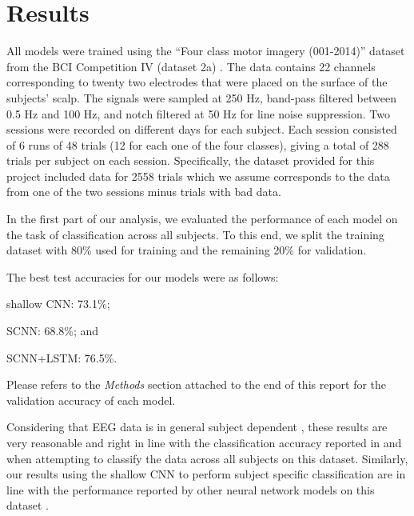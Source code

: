 \documentclass[10pt,twocolumn,letterpaper]{article}
\begin{document}


\section{Results}
All models were trained using the ``Four class motor imagery (001-2014)''
dataset from the BCI Competition IV (dataset 2a) \cite{brunner2008bci}.
The data contains 22 channels corresponding to twenty two electrodes that were
placed on the surface of the subjects' scalp.
The signals were sampled at 250 Hz, band-pass filtered between 0.5 Hz and 100
Hz, and notch filtered at 50 Hz for line noise suppression.
Two sessions were recorded on different days for each subject. Each session
consisted of 6 runs of 48 trials (12 for each one of the four classes), giving a
total of 288 trials per subject on each session. Specifically, the dataset
provided for this project included data for 2558 trials which we assume
corresponds to the data from one of the two sessions minus trials with bad data.

In the first part of our analysis, we evaluated the performance of each model on
the task of classification across all subjects. To this end, we split the
training dataset with 80\% used for training and the remaining 20\% for
validation.

The best test accuracies for our models were as follows:
\begin{enumerate*}
    \item shallow CNN: 73.1\%;
    \item SCNN: 68.8\%; and
    \item SCNN+LSTM: 76.5\%.
\end{enumerate*}
Please refers to the \emph{Methods} section attached to the end of this report
for the validation accuracy of each model.

Considering that EEG data
is in general subject dependent \cite{wang}, these results are very reasonable
and right in line with the classification accuracy reported in
\cite{kostas2019machine} and \cite{DBLP} when attempting to classify the data
across all subjects on this dataset. Similarly, our results using the shallow
CNN to perform subject specific classification are in line with the performance
reported by other neural network models on this dataset \cite{wang}.
\end{document}
